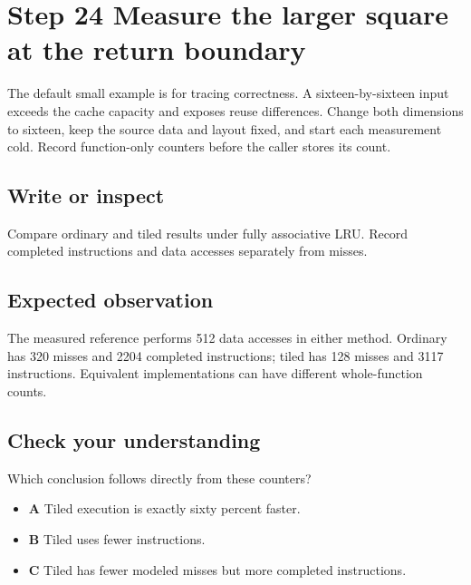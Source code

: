 \section{Step 24 Measure the larger square at the return boundary}\label{transpose-s24}

The default small example is for tracing correctness. A sixteen-by-sixteen input exceeds the cache capacity and exposes reuse differences. Change both dimensions to sixteen, keep the source data and layout fixed, and start each measurement cold. Record function-only counters before the caller stores its count.

\subsection{Write or inspect}
Compare ordinary and tiled results under fully associative LRU. Record completed instructions and data accesses separately from misses.

\subsection{Expected observation}
The measured reference performs 512 data accesses in either method. Ordinary has 320 misses and 2204 completed instructions; tiled has 128 misses and 3117 instructions. Equivalent implementations can have different whole-function counts.

\subsection{Check your understanding}
Which conclusion follows directly from these counters?

\begin{itemize}
  \item \textbf{A} Tiled execution is exactly sixty percent faster.
  \item \textbf{B} Tiled uses fewer instructions.
  \item \textbf{C} Tiled has fewer modeled misses but more completed instructions.
\end{itemize}
